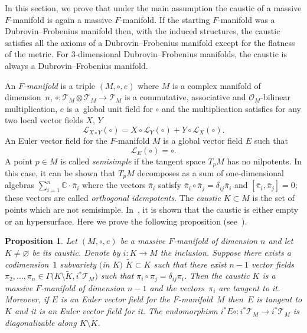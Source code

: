\documentclass[10pt,a4paper]{amsart}
\numberwithin{equation}{section}
\newtheorem{Proposition}[Theorem]{Proposition}
 { \theoremstyle{definition}
\newtheorem{Definition}[Theorem]{Definition}
\newtheorem{Note}[Theorem]{Note}
\newtheorem{Example}[Theorem]{Example}
\newtheorem{Remark}[Theorem]{Remark} }
\begin{document}
In this section, we prove that under the main assumption the caustic of a massive $F$-manifold is again a massive $F$-manifold. If the starting $F$-manifold was a Dubrovin--Frobenius manifold then, with the induced structures, the caustic satisfies all the axioms of a Dubrovin--Frobenius manifold except for the flatness of the metric. For $3$-dimensional Dubrovin--Frobenius manifolds, the caustic is always a Dubrovin--Frobenius manifold.
\begin{Definition}
 An \emph{$F$-manifold} is a triple $(M,\circ,e)$ where $M$ is a complex manifold of dimension~$n$, $\circ\colon\mathcal{T}_{M}\otimes\mathcal{T}_{M}\rightarrow\mathcal{T}_{M}$ is a commutative, associative and $\mathcal{O}_{M}$-bilinear multiplication, $e$ is a~global unit field for $\circ$ and the multiplication satisfies for any two local vector fields $X$, $Y$
 \begin{equation}
 \label{eq:Compatibility}
 \mathcal{L}_{X\circ Y} ( \circ ) = X\circ\mathcal{L}_{ Y} ( \circ ) + Y\circ\mathcal{L}_{X} ( \circ ).
 \end{equation}
 An Euler vector field for the $F$-manifold $M$ is a global vector field $E$ such that
 \begin{equation}
 \label{eq:Euler}
 \mathcal{L}_{E}( \circ )= \circ.
 \end{equation}
 A point $p\in M$ is called \emph{semisimple} if the tangent space $T_{p}M$ has no nilpotents. In this case, it can be shown that $T_{p}M$ decomposes as a sum of one-dimensional algebras $\sum_{i=1}^{n}\mathbb{C}\cdot \bar{\pi}_{i}$ where the vectors $\bar{\pi}_{i}$ satisfy $\bar{\pi}_{i}\circ\bar{\pi}_{j}=\delta_{ij}\bar{\pi}_{i}$ and $[\bar{\pi}_{i},\bar{\pi}_{j}]=0$; these vectors are called \emph{orthogonal idempotents}. The \emph{caustic} $K\subset M$ is the set of points which are not semisimple. In~\cite[Proposition~2.6]{HertlingFrobenius}, it is shown that the caustic is either empty or an hypersurface.
 Here we prove the following proposition (see~\cite{Strachan_2004}).
\end{Definition}
\begin{Proposition}
 \label{prop:F-Caustic}
 Let $(M,\circ,e)$ be a massive $F$-manifold of dimension $n$ and let $K\neq\varnothing$ be its caustic. Denote by $i\colon K\rightarrow M$ the inclusion. Suppose there exists a codimension~$1$ subvariety $($in $K)$ $\tilde{K}\subset K$ such that there exist $n-1$ vector fields $\pi_{2},\dots,\pi_{n}\in\Gamma\bigl(K\setminus\tilde{K}, i^{*}\mathcal{T}_{M}\bigr)$ such that $\pi_{i}\circ\pi_{j}=\delta_{ij}\pi_{i}$. Then the caustic $K$ is a massive $F$-manifold of dimension $n-1$ and the vectors~$\pi_{i}$ are tangent to it. Moreover, if $E$ is an Euler vector field for the $F$-manifold~$M$ then~$E$ is tangent to $K$ and it is an Euler vector field for it. The endomorphism $i^{*}E\circ\colon i^{*}\mathcal{T}_{M}\rightarrow i^{*}\mathcal{T}_{M}$ is diagonalizable along $K\setminus\tilde{K}$.
\end{Proposition}
\end{document}
